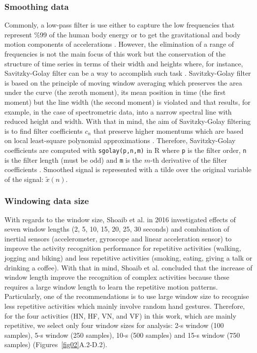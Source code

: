 \documentclass[fleqn,10pt]{wlscirep}
\begin{document}
\subsubsection*{Smoothing data}
Commonly, a low-pass filter is use either to capture the low 
frequencies that represent \%99 of the human body energy or to get 
the gravitational and body motion components of 
accelerations \cite{anguita2013}. However, the elimination of 
a range of frequencies is not the main focus of this work but 
the conservation of the structure of time series in terms of 
their width and heights where, for instance, Savitzky-Golay filter 
can be a way to accomplish such task \cite{press1992}. 
Savitzky-Golay filter is based on the 
principle of moving window averaging which preserves the area under 
the curve (the zeroth moment), its mean position in time 
(the first moment) but the line width (the second moment) is violated 
and that results, for example, in the case of spectrometric data, into
a narrow spectral line with reduced height and width. 
With that in mind, the aim of Savitzky-Golay filtering is to find filter 
coefficients $c_n$ that preserve higher momentums which are based on local 
least-square polynomial approximations \cite{savitzkygolay1964, 
press1992, schafer2011}.
Therefore, Savitzky-Golay coefficients are computed with \texttt{sgolay(p,n,m)} 
in R where \texttt{p} is the filter order, 
\texttt{n} is the filter length (must be odd) and \texttt{m} is the 
$m$-th derivative of the filter coefficients \cite{Rsignal}. 
Smoothed signal is represented with a tilde over the original 
variable of the signal: $\tilde{x}(n)$.

\subsubsection*{Windowing data size}
With regards to the window size, Shoaib et al. in 2016 \cite{shoaib2016} 
investigated effects of seven window lengths (2, 5, 10, 15, 20, 25, 30 seconds)
and combination of inertial sensors (accelerometer, gyroscope and linear 
acceleration sensor) to improve the activity recognition performance for 
repetitive activities (walking, jogging and biking) and less repetitive 
activities (smoking, eating, giving a talk or drinking a coffee).
With that in mind, Shoaib et al. \cite{shoaib2016} concluded that the 
increase of window length improve the recognition of complex activities 
because these requires a large window length to learn the repetitive 
motion patterns. Particularly, one of the recommendations is to use large 
window size to recognise less repetitive activities which mainly involve 
random hand gestures. Therefore, for the four activities 
(HN, HF, VN, and VF) in this work, which are mainly repetitive, 
we select only four window sizes for analysis: 2-s window (100 samples), 
5-s window (250 samples), 10-s (500 samples) and 15-s window (750 samples) 
(Figures~\ref{fig02}A.2-D.2).
\end{document}
